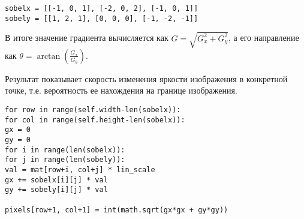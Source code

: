\begin{lstlisting}
sobelx = [[-1, 0, 1], [-2, 0, 2], [-1, 0, 1]]
sobely = [[1, 2, 1], [0, 0, 0], [-1, -2, -1]]
\end{lstlisting}

В итоге значение градиента вычисляется как $G=\sqrt{G_x^2+G_y^2}$, а его направление как $\theta=\arctan(\frac{G_x}{G_y})$.

Результат показывает скорость изменения яркости изображения в конкретной точке, т.е. вероятность ее нахождения на границе изображения.

\begin{lstlisting}
for row in range(self.width-len(sobelx)):
for col in range(self.height-len(sobelx)):
gx = 0
gy = 0
for i in range(len(sobelx)):
for j in range(len(sobely)):
val = mat[row+i, col+j] * lin_scale
gx += sobelx[i][j] * val
gy += sobely[i][j] * val

pixels[row+1, col+1] = int(math.sqrt(gx*gx + gy*gy))
\end{lstlisting}